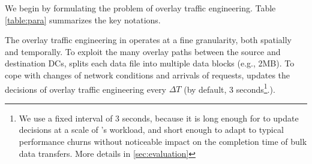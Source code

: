 \begin{table}[t]
\begin{center}
\end{center}
\caption{Notations used in \name's decision-making logic.}
\label{table:para}
\end{table}

We begin by formulating the problem of overlay traffic engineering.
Table \ref{table:para} summarizes the key notations.

The overlay traffic engineering in \name operates at a
fine granularity, both spatially and temporally. To exploit the many
overlay paths between the source and destination DCs, \name splits
each data file into multiple data blocks (e.g., 2MB).
To cope with changes of network conditions and arrivals of requests,
\name updates the decisions of overlay traffic engineering every
$\Delta T$ (by default, 3 seconds\footnote{We use a fixed interval of
3 seconds, because it is long enough for \name to update decisions at
a scale of \company's workload, and short enough to adapt to typical
performance churns without noticeable impact on the completion time
of bulk data transfers.
More details in \Section\ref{sec:evaluation}}.).


